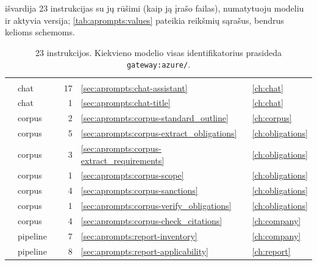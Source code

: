  išvardija 23 instrukcijas su jų rūšimi (kaip ją įrašo failas),
numatytuoju modeliu ir aktyvia versija; \cref{tab:aprompts:values} pateikia reikšmių sąrašus,
bendrus kelioms schemoms.

\begin{xltabular}{\textwidth}{@{}L{50mm}L{15mm}L{24mm}rL{11mm}Y@{}}
\caption{23 instrukcijos. Kiekvieno modelio visas identifikatorius prasideda \texttt{gateway:azure/}.}\label{tab:aprompts:all}\\
\toprule
{} &  &  &  &  &  \\
\midrule
\endfirsthead
\toprule
{} &  &  &  &  &  \\
\midrule
\endhead
\bottomrule
\endlastfoot
{} & chat &  & 17 & \ref{sec:aprompts:chat-assistant} & \cref{ch:chat} \\
 & chat &  & 1 & \ref{sec:aprompts:chat-title} & \cref{ch:chat} \\
 & corpus &  & 2 & \ref{sec:aprompts:corpus-standard_outline} & \cref{ch:corpus} \\
 & corpus &  & 5 & \ref{sec:aprompts:corpus-extract_obligations} & \cref{ch:obligations} \\
 & corpus &  & 3 & \ref{sec:aprompts:corpus-extract_requirements} & \cref{ch:obligations} \\
 & corpus &  & 1 & \ref{sec:aprompts:corpus-scope} & \cref{ch:obligations} \\
 & corpus &  & 4 & \ref{sec:aprompts:corpus-sanctions} & \cref{ch:obligations} \\
 & corpus &  & 1 & \ref{sec:aprompts:corpus-verify_obligations} & \cref{ch:obligations} \\
 & corpus &  & 4 & \ref{sec:aprompts:corpus-check_citations} & \cref{ch:company} \\
 & pipeline &  & 7 & \ref{sec:aprompts:report-inventory} & \cref{ch:company} \\
 & pipeline &  & 8 & \ref{sec:aprompts:report-applicability} & \cref{ch:report} \\

\end{xltabular}
